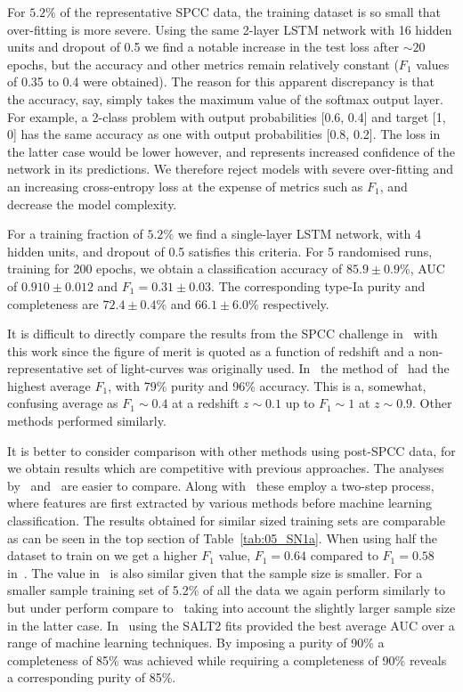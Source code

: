 \documentclass[twocolumn]{aastex61}
\begin{document}
For $5.2\%$ of the representative SPCC data, the training dataset is so small that over-fitting is more severe. Using the same 2-layer LSTM network with 16 hidden units and dropout of 0.5 we find a notable increase in the test loss after $\sim 20$ epochs, but the accuracy and other metrics remain relatively constant ($F_1$ values of 0.35 to 0.4 were obtained). The reason for this apparent discrepancy is that the accuracy, say, simply takes the maximum value of the softmax output layer. For example, a 2-class problem with output probabilities [0.6, 0.4] and target [1, 0] has the same accuracy as one with output probabilities [0.8, 0.2]. The loss in the latter case would be lower however, and represents increased confidence of the network in its predictions. We therefore reject models with severe over-fitting and an increasing cross-entropy loss at the expense of metrics such as $F_1$, and decrease the model complexity. 

For a training fraction of  $5.2\%$ we find a single-layer LSTM network, with 4 hidden units, and dropout of 0.5 satisfies this criteria. For 5 randomised runs, training for 200 epochs, we obtain a classification accuracy of $85.9 \pm 0.9$\%, AUC of $0.910 \pm 0.012$ and $F_1 = 0.31 \pm 0.03$. The corresponding type-Ia purity and completeness are $72.4\pm0.4\%$ and $66.1\pm6.0\%$ respectively.

It is difficult to directly compare the results from the SPCC challenge in~\cite{Kessler:2010qj} with this work since the figure of merit is quoted as a function of redshift and a non-representative set of light-curves was originally used. In~\cite{Kessler:2010qj} the method of~\cite{2008AJ....135..348S} had the highest average $F_1$, with 79\% purity and 96\% accuracy. This is a, somewhat, confusing average as $F_1\sim 0.4$ at a redshift $z\sim0.1$ up to $F_1\sim1$ at $z\sim0.9$. Other methods performed similarly. 

It is better to consider comparison with other methods using post-SPCC data, for we obtain results which are competitive with previous approaches. The analyses by~\cite{Karpenka:2012pm} and~\cite{Newling:2010bp} are easier to compare. Along with~\cite{Lochner:2016hbn} these employ a two-step process, where features are first extracted by various methods before machine learning classification. The results obtained for similar sized training sets are comparable as can be seen in the top section of Table~\ref{tab:05_SN1a}. When using half the dataset to train on we get a higher $F_1$ value, $F_1=0.64$ compared to $F_1=0.58$ in~\cite{Karpenka:2012pm}. The value in~\cite{Newling:2010bp} is also similar given that the sample size is smaller. For a smaller sample training set of 5.2\% of all the data we again perform similarly to~\cite{Karpenka:2012pm} but under perform compare to~\cite{Newling:2010bp} taking into account the slightly larger sample size in the latter case. In~\cite{Lochner:2016hbn} using the SALT2 fits provided the best average AUC over a range of machine learning techniques. By imposing a purity of 90\% a completeness of 85\% was achieved while requiring a completeness of 90\% reveals a corresponding purity of 85\%.
\end{document}
